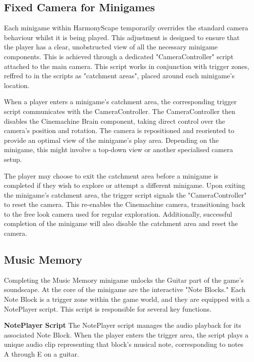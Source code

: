 \documentclass{l4proj}
\begin{document}
\subsection{Fixed Camera for Minigames}
Each minigame within HarmonyScape temporarily overrides the standard camera behaviour whilst it is being played. This adjustment is designed to ensure that the player has a clear, unobstructed view of all the necessary minigame components. This is achieved through a dedicated "CameraController" script attached to the main camera. This script works in conjunction with trigger zones, reffred to in the scripts as "catchment areas", placed around each minigame's location.

When a player enters a minigame's catchment area, the corresponding trigger script communicates with the CameraController. The CameraController then disables the Cinemachine Brain component, taking direct control over the camera's position and rotation. The camera is repositioned and reoriented to provide an optimal view of the minigame's play area. Depending on the minigame, this might involve a top-down view or another specialised camera setup.

The player may choose to exit the catchment area before a minigame is completed if they wish to explore or attempt a different minigame. Upon exiting the minigame's catchment area, the trigger script signals the "CameraController" to reset the camera. This re-enables the Cinemachine camera, transitioning back to the free look camera used for regular exploration. Additionally, successful completion of the minigame will also disable the catchment area and reset the camera.

\subsection{Music Memory}
Completing the Music Memory minigame unlocks the Guitar part of the game's soundscape. At the core of the minigame are the interactive "Note Blocks." Each Note Block is a trigger zone within the game world, and they are equipped with a NotePlayer script. This script is responsible for several key functions.

\textbf{NotePlayer Script} \newline
The NotePlayer script manages the audio playback for its associated Note Block. When the player enters the trigger area, the script plays a unique audio clip representing that block's musical note, corresponding to notes A through E on a guitar.
\end{document}
